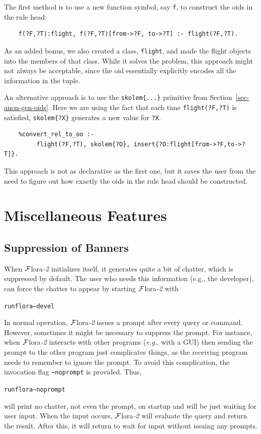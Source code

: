 \documentclass[11pt]{article}
\newcommand{\FLORA}{{\mbox{\sc ${\cal F}${lora}\rm\emph{-2}}}\xspace}
\newcommand{\FLSYSTEM}{\FLORA}
\newcommand{\ENGINERUN}{runflora}
\begin{document}
The first method is to use a new function symbol, say {\tt f}, to construct
the oids in the rule head:
\begin{verbatim}
    f(?F,?T):flight, f(?F,?T)[from->?F, to->?T] :- flight(?F,?T).  
\end{verbatim}
As an added bonus, we also created a class, {\tt flight}, and made the
flight objects into the members of that class. 
While it solves the problem, this approach might not always be acceptable,
since the oid essentially explicitly encodes all the information in the tuple.

An alternative approach is to use the {\tt skolem\{...\}} primitive from
Section~\ref{sec-anon-gen-oids}. Here we are using the fact that each time
{\tt flight(?F,?T)} is satisfied, {\tt skolem\{?X\}} generates a new value for
{\tt ?X}.    
\begin{verbatim}
    %convert_rel_to_oo :-
         flight(?F,?T), skolem{?O}, insert{?O:flight[from->?F,to->?T]}.
\end{verbatim}
This approach is not as declarative as the first one, but it saves the user
from the need to figure out how exactly the oids in the rule head should be
constructed.


\section{Miscellaneous Features}

\subsection{Suppression of Banners}
When \FLSYSTEM initializes itself, it generates quite a bit of chatter,
which is suppressed by default. The user who needs this information (e.g.,
the developer), can force the chatter to appear by starting \FLSYSTEM with
\begin{alltt}
 \ENGINERUN --devel
\end{alltt}

In normal operation, \FLSYSTEM issues a prompt after every query or
command. However, sometimes it might be necessary to suppress the prompt.
For instance, when \FLSYSTEM
interacts with other programs ({\it e.g.}, with a GUI) then sending the
prompt to the other program just complicates things, as the receiving
program needs to remember to ignore the prompt. To avoid this complication,
the invocation flag {\tt --noprompt} is provided. Thus,
\begin{alltt}
 \ENGINERUN --noprompt
\end{alltt}
will print no chatter, not even the prompt,
on startup and will be just waiting for user input. When
the input occurs, \FLSYSTEM will evaluate the query and return the result.
After this, it will return to wait for input without issuing any
prompts.
\end{document}
